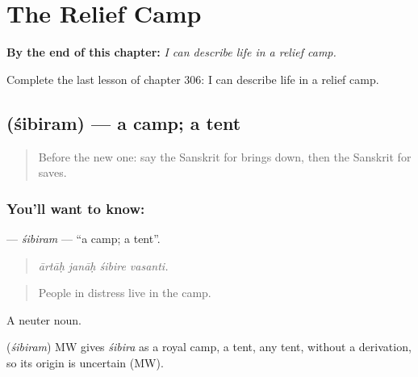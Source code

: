 
\chapter{The Relief Camp}
\label{ch:sa-the-relief-camp}

\begin{chapteropening}
\textbf{By the end of this chapter:} \emph{I can describe life in a relief camp.}

Complete the last lesson of chapter 306: I can describe life in a relief camp.
\end{chapteropening}

\section[\texorpdfstring{\sk{शिबिरम्} (śibiram)}{शिबिरम् (śibiram)}]{ (śibiram) — a camp; a tent}

\label{lesson:SA-C306-sibiram}



\begin{quote}
Before the new one: say the Sanskrit for brings down, then the Sanskrit for saves.
\end{quote}

\subsection*{You'll want to know: }
\textbf{} — \emph{śibiram} — \textquotedblleft{}a camp; a tent\textquotedblright{}.

\begin{quote}
   
\end{quote}

\begin{quote}
\emph{ārtāḥ janāḥ śibire vasanti.}
\end{quote}

\begin{quote}
People in distress live in the camp.
\end{quote}

A neuter noun.

\begin{cousinweb}
\textbf{} (\emph{śibiram}) MW gives \emph{śibira} as a royal camp, a tent, any tent, without a derivation, so its origin is uncertain (MW).
\end{cousinweb}

